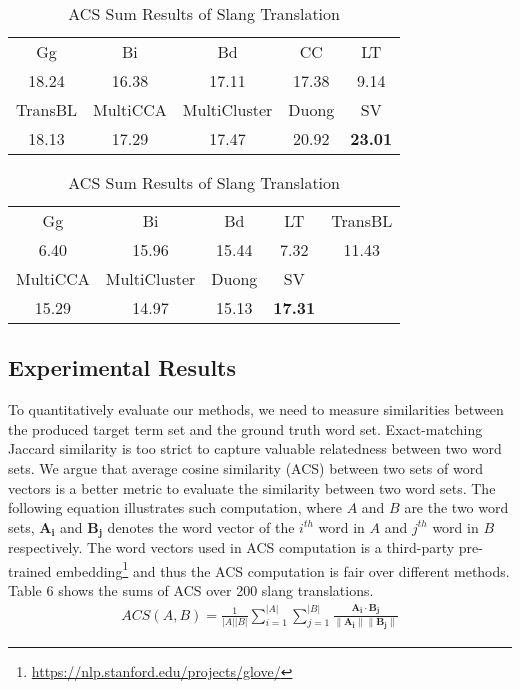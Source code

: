 \begin{table}[th!] 
	\scriptsize
	\centering
	\begin{subtable}[h]{\columnwidth}
		\centering
		\begin{tabular}{|ccccc|}
			\hline
			Gg&  Bi& Bd & CC & LT   \\ 
			18.24 &  16.38&  17.11 & 17.38 & 9.14 \\ \hline   
			TransBL& MultiCCA & MultiCluster & Duong   & SV \\ 
			18.13 &  17.29 & 17.47&  20.92& \textbf{23.01}\\ \hline  
		\end{tabular}
	\end{subtable}
	\vfill \hfill
	\begin{subtable}[h]{\columnwidth}
		\centering
		\begin{tabular}{|ccccc|}
			\hline
			Gg&  Bi& Bd &  LT   & TransBL\\ 
			6.40  &   15.96 &  15.44  & 7.32 & 11.43\\ \hline   
			MultiCCA & MultiCluster & Duong   & SV & \\ 
			15.29 & 14.97&  15.13& \textbf{17.31} & \\ \hline  
		\end{tabular}
	\end{subtable}
	\caption{\small ACS Sum Results of Slang Translation \vspace{-5pt}}
	\label{tab:bleis_acs}
\end{table}
\subsection{Experimental Results}
\label{sec:exp}
To quantitatively evaluate our methods, we need to measure similarities between the produced target term set and the ground truth word set. 
Exact-matching Jaccard similarity is too strict to capture valuable relatedness between two word sets.
We argue that average cosine similarity (ACS) between two sets of word vectors is a better metric to evaluate the similarity between two word sets. The following equation illustrates such computation, where $A$ and $B$ are the two word sets, $\mathbf{A_i}$ and $\mathbf{B_j}$ denotes the word vector of the $i^{th}$ word in $A$ and $j^{th}$ word in $B$ respectively. 
The word vectors used in ACS computation is a third-party pre-trained 
embedding\footnote{\scriptsize \url{https://nlp.stanford.edu/projects/glove/}} and thus the ACS computation is fair over different methods.
Table 6 shows the sums of ACS over 200 slang translations. 
\begin{align*}
ACS (A,B)=
{\frac{1}{|A||B|}}{\sum_{i=1}^{|A|}{\sum_{j=1}^{|B|}} \frac{\mathbf{A_i }\cdot \mathbf{B_j}}{\|\mathbf{A_i }\|\|\mathbf{B_j }\|}}
\end{align*}


